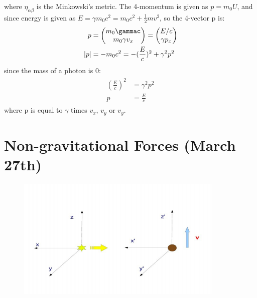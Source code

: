 \documentclass[12pt,a4paper]{article}
\begin{document}
where $\eta_{\alpha\beta}$ is the Minkowski's metric. The 4-momentum is given as $p=m_0U$, and since energy is given as $E=\gamma m_0c^2=m_0c^2+\frac{1}{2}mv^2$, so the 4-vector p is:
\begin{align}
    p&=
    \begin{pmatrix}
      m_0\gammac \\
      m_0\gamma v_x
    \end{pmatrix}=
    \begin{pmatrix}
      E/c \\
      \gamma p_x
    \end{pmatrix} \\
    |p| &= -m_0c^2=-(\frac{E}{c})^2+\gamma^2p^2
\end{align}
since the mass of a photon is 0:
\begin{align}
\begin{split}
    (\frac{E}{c})^2&=\gamma^2p^2 \\
    p&=\frac{E}{c}
\end{split}
\end{align}
where p is equal to $\gamma$ times $v_x$, $v_y$ or $v_y$.
\vspace{10mm}

\section{Non-gravitational Forces (March 27th)}

\begin{figure}
\includegraphics[scale=0.85]{3}
\end{figure} 
\end{document}

